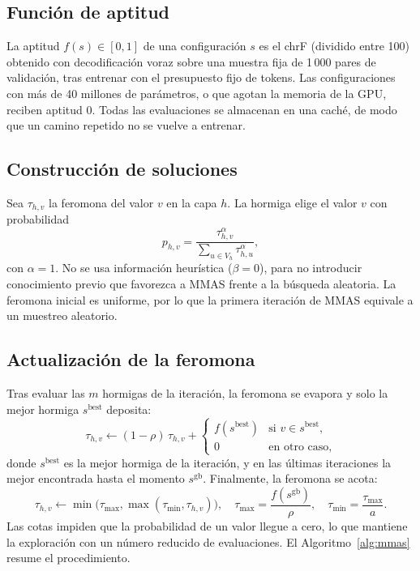 \documentclass[conference]{IEEEtran}
\newcommand{\chrf}{chrF}
\begin{document}
\subsection{Función de aptitud}
La aptitud $f(s) \in [0, 1]$ de una configuración $s$ es el \chrf{}
(dividido entre 100) obtenido con decodificación voraz sobre una muestra
fija de 1\,000 pares de validación, tras entrenar con el presupuesto fijo
de tokens. Las configuraciones con más de 40 millones de parámetros, o
que agotan la memoria de la GPU, reciben aptitud 0. Todas las
evaluaciones se almacenan en una caché, de modo que un camino repetido no
se vuelve a entrenar.

\subsection{Construcción de soluciones}
Sea $\tau_{h,v}$ la feromona del valor $v$ en la capa $h$. La hormiga
elige el valor $v$ con probabilidad
\begin{equation}
  p_{h,v} = \frac{\tau_{h,v}^{\alpha}}{\sum_{u \in V_h} \tau_{h,u}^{\alpha}},
  \label{eq:transicion}
\end{equation}
con $\alpha = 1$. No se usa información heurística ($\beta = 0$), para no
introducir conocimiento previo que favorezca a MMAS frente a la búsqueda
aleatoria. La feromona inicial es uniforme, por lo que la primera
iteración de MMAS equivale a un muestreo aleatorio.

\subsection{Actualización de la feromona}
Tras evaluar las $m$ hormigas de la iteración, la feromona se evapora y
solo la mejor hormiga $s^{\text{best}}$ deposita:
\begin{equation}
  \tau_{h,v} \leftarrow (1 - \rho)\,\tau_{h,v} +
  \begin{cases}
    f(s^{\text{best}}) & \text{si } v \in s^{\text{best}},\\
    0 & \text{en otro caso,}
  \end{cases}
  \label{eq:actualizacion}
\end{equation}
donde $s^{\text{best}}$ es la mejor hormiga de la iteración, y en las
últimas iteraciones la mejor encontrada hasta el momento
$s^{\text{gb}}$. Finalmente, la feromona se acota:
\begin{equation}
  \tau_{h,v} \leftarrow \min\bigl(\tau_{\max}, \max(\tau_{\min}, \tau_{h,v})\bigr),
  \quad
  \tau_{\max} = \frac{f(s^{\text{gb}})}{\rho},
  \quad
  \tau_{\min} = \frac{\tau_{\max}}{a}.
  \label{eq:cotas}
\end{equation}
Las cotas impiden que la probabilidad de un valor llegue a cero, lo que
mantiene la exploración con un número reducido de evaluaciones. El
Algoritmo~\ref{alg:mmas} resume el procedimiento.
\end{document}
